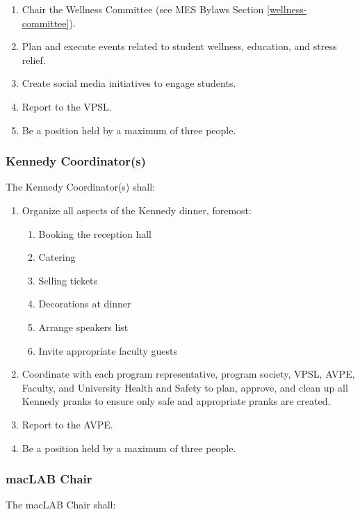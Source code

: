 \begin{enumerate}
 \item
  Chair the Wellness Committee (see MES Bylaws Section \ref{wellness-committee}).
 \item
  Plan and execute events related to student wellness, education, and stress relief.
 \item
  Create social media initiatives to engage students.
 \item
  Report to the VPSL.
 \item
  Be a position held by a maximum of three people.

\end{enumerate}

\subsubsection{Kennedy Coordinator(s)}
\label{kennedy-coordinators}
The Kennedy Coordinator(s) shall:

\begin{enumerate}
 \item
  Organize all aspects of the Kennedy dinner, foremost:

  \begin{enumerate}
   \item
    Booking the reception hall
   \item
    Catering
   \item
    Selling tickets
   \item
    Decorations at dinner
   \item
    Arrange speakers list
   \item
    Invite appropriate faculty guests
  \end{enumerate}
 \item
  Coordinate with each program representative, program society, VPSL, AVPE, Faculty, and University Health and Safety to plan, approve, and clean up all Kennedy pranks to ensure only safe and appropriate pranks are created.
 \item
  Report to the AVPE.
 \item
  Be a position held by a maximum of three people.

\end{enumerate}
\subsubsection{macLAB Chair}
\label{maclab-chair}

The macLAB Chair shall:

